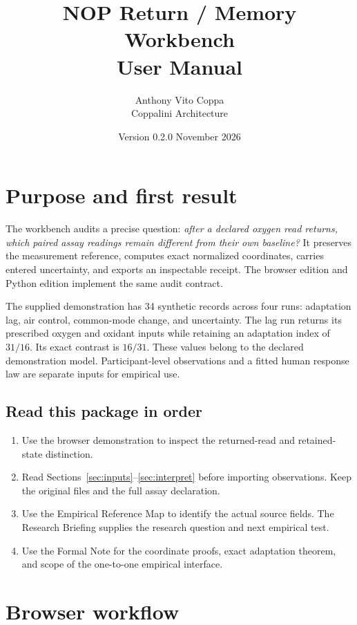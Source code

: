 \documentclass[11pt]{article}
\title{\Large\bfseries NOP Return / Memory Workbench\\[6pt]\normalsize\mdseries User Manual}
\author{Anthony Vito Coppa\\\small Coppalini Architecture}
\date{Version 0.2.0 \quad 12 November 2026}
\begin{document}
\maketitle
\vspace{-1em}

\section*{Purpose and first result}

The workbench audits a precise question: \emph{after a declared oxygen read
returns, which paired assay readings remain different from their own
baseline?} It preserves the measurement reference, computes exact normalized
coordinates, carries entered uncertainty, and exports an inspectable receipt.
The browser edition and Python edition implement the same audit contract.

The supplied demonstration has 34 synthetic records across four runs:
adaptation lag, air control, common-mode change, and uncertainty. The lag run
returns its prescribed oxygen and oxidant inputs while retaining an adaptation
index of \(31/16\). Its exact contrast is \(16/31\). These values belong to
the declared demonstration model. Participant-level observations and a fitted
human response law are separate inputs for empirical use.

\subsection*{Read this package in order}
\begin{enumerate}
\item Use the browser demonstration to inspect the returned-read and
retained-state distinction.
\item Read Sections~\ref{sec:inputs}--\ref{sec:interpret} before importing
observations. Keep the original files and the full assay declaration.
\item Use the Empirical Reference Map to identify the actual source fields.
The Research Briefing supplies the research question and next empirical test.
\item Use the Formal Note for the coordinate proofs, exact adaptation theorem,
and scope of the one-to-one empirical interface.
\end{enumerate}

\section{Browser workflow}\label{sec:browser}
\end{document}
